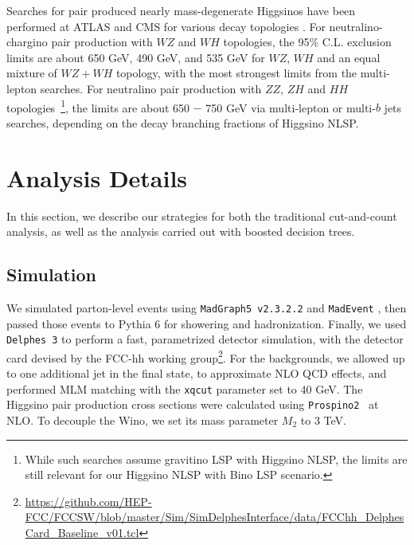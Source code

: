 \documentclass[a4paper,11pt]{article}
\begin{document}
Searches for pair produced nearly mass-degenerate Higgsinos  have been
performed at ATLAS and CMS for various decay  topologies
\cite{Aaboud:2018htj,Sirunyan:2018ubx,Aaboud:2018zeb}.  
For neutralino-chargino pair production with $WZ$ and $WH$ topologies, the 95\%
C.L. exclusion limits are about 650 GeV, 490 GeV, and 535 GeV for $WZ$, $WH$
and an equal mixture of $WZ+WH$ topology, with the most strongest limits from
the multi-lepton searches.  For neutralino pair production with $ZZ$, $ZH$ and
$HH$ topologies~\footnote{While such searches assume gravitino LSP with
Higgsino NLSP, the limits are still relevant for our Higgsino NLSP with Bino
LSP scenario.}, the limits are about 650 $-$ 750 GeV via multi-lepton or
multi-$b$ jets searches, depending on the decay branching fractions of Higgsino
NLSP. 


 

\section{Analysis Details}\label{sec:analysis}

In this section, we  describe our strategies for both the traditional
cut-and-count analysis, as well as the analysis carried out with boosted
decision trees. 

\subsection{Simulation}\label{simulation}

We simulated parton-level events using \texttt{MadGraph5 v2.3.2.2} and
\texttt{MadEvent} \cite{Alwall:2014hca}, then passed those events to Pythia 6
\cite{Sjostrand:2006za} for showering and hadronization. Finally, we used
\texttt{Delphes 3} \cite{deFavereau:2013fsa} to perform a fast, parametrized
detector simulation, with the detector card devised by the FCC-hh working
group\footnote{\url{https://github.com/HEP-FCC/FCCSW/blob/master/Sim/SimDelphesInterface/data/FCChh_DelphesCard_Baseline_v01.tcl}}.
For the backgrounds, we allowed up to one additional jet in the final state, to
approximate NLO QCD effects, and performed MLM matching with the \texttt{xqcut}
parameter set to 40 GeV. The Higgsino pair production cross sections were
calculated using \texttt{Prospino2}~\cite{Beenakker:1999xh} at NLO.  
To decouple the Wino, we set its mass parameter $M_2$ to 3 TeV.  
\end{document}

